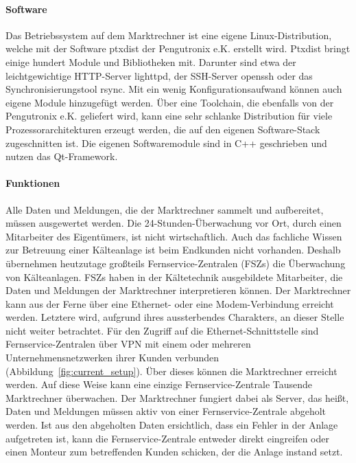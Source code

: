 \documentclass[11pt,a4paper]{report}
\begin{document}
\paragraph{Software}

Das Betriebssystem auf dem Marktrechner ist eine eigene Linux-Distribu\-tion, welche mit der Software ptxdist der Pengutronix e.K. erstellt wird. Ptxdist bringt einige hundert Module und Bibliotheken mit. Darunter sind etwa der leichtgewichtige HTTP-Server lighttpd, der SSH-Server openssh oder das Synchronisierungstool rsync. Mit ein wenig Konfigurationsaufwand können auch eigene Module hinzugefügt werden. Über eine Toolchain, die ebenfalls von der Pengutronix e.K. geliefert wird, kann eine sehr schlanke Distribution für viele Prozessorarchitekturen erzeugt werden, die auf den eigenen Software-Stack zugeschnitten ist. Die eigenen Softwaremodule sind in C++ geschrieben und nutzen das Qt-Framework. 

\paragraph{Funktionen} \label{para:architektur}

Alle Daten und Meldungen, die der Marktrechner sammelt und aufbereitet, müssen ausgewertet werden. Die 24-Stunden-Überwachung vor Ort, durch einen Mitarbeiter des Eigentümers, ist nicht wirtschaftlich. Auch das fachliche Wissen zur Betreuung einer Kälteanlage ist beim Endkunden nicht vorhanden. Deshalb übernehmen heutzutage großteils Fernservice-Zentralen (FSZs) die Überwachung von Kälteanlagen. FSZs haben in der Kältetechnik ausgebildete Mitarbeiter, die Daten und Meldungen der Marktrechner interpretieren können. Der Marktrechner kann aus der Ferne über eine Ethernet- oder eine Modem-Verbindung erreicht werden. Letztere wird, aufgrund ihres aussterbendes Charakters, an dieser Stelle nicht weiter betrachtet. Für den Zugriff auf die Ethernet-Schnittstelle sind Fernservice-Zentralen über VPN mit einem oder mehreren Unternehmensnetzwerken ihrer Kunden verbunden (Abbildung~\ref{fig:current_setup}). Über dieses können die Marktrechner erreicht werden. Auf diese Weise kann eine einzige Fernservice-Zentrale Tausende Marktrechner überwachen. Der Marktrechner fungiert dabei als Server, das heißt, Daten und Meldungen müssen aktiv von einer Fernservice-Zentrale abgeholt werden. Ist aus den abgeholten Daten ersichtlich, dass ein Fehler in der Anlage aufgetreten ist, kann die Fernservice-Zentrale entweder direkt eingreifen oder einen Monteur zum betreffenden Kunden schicken, der die Anlage instand setzt.
\end{document}
